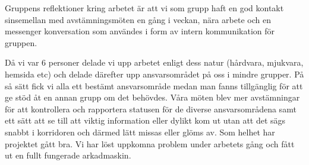\documentclass[12pt,fleqn,openany]{book} %
\begin{document}
Gruppens reflektioner kring arbetet är att vi som grupp haft en god kontakt sinsemellan med avstämningsmöten en gång i veckan, nära 
arbete och en messenger konversation som användes i form av intern kommunikation för gruppen.
\bigskip

Då vi var 6 personer delade vi upp arbetet enligt dess natur (hårdvara, mjukvara, hemsida etc) och delade därefter upp ansvarsområdet 
på oss i mindre grupper. På så sätt fick vi alla ett bestämt ansvarsområde medan man fanns tillgänglig för att ge stöd åt en annan 
grupp om det behövdes. Våra möten blev mer avstämningar för att kontrollera och rapportera statusen för de diverse ansvarsområdena 
samt ett sätt att se till att viktig information eller dylikt kom ut utan att det sägs snabbt i korridoren och därmed lätt missas 
eller glöms av. Som helhet har projektet gått bra. Vi har löst uppkomna problem under arbetets gång och fått ut en fullt fungerade arkadmaskin. 
\bigskip
\end{document}
